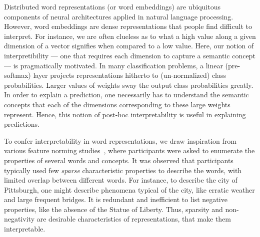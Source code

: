 \documentclass{article}
\begin{document}
Distributed word representations (or word embeddings) are ubiquitous components of neural architectures applied in natural language processing. However, word embeddings are dense representations that people find difficult to interpret. For instance, we are often clueless as to what a high value along a given dimension of a vector signifies when compared to a low value. Here, our notion of interpretibility --- one that requires each dimension to capture a semantic concept --- is pragmatically motivated. In many classification problems, a linear (pre-softmax) layer projects representations hitherto to (un-normalized) class probabilities. Larger values of weights sway the output class probabilities greatly.  
In order to explain a prediction, one necessarily has to understand the semantic concepts that each of the dimensions corresponding to these large weights represent. Hence, this notion of post-hoc interpretability is useful in explaining predictions.



To confer interpretability in word representations, we draw inspiration from various feature norming studies~\cite{garrard2001prototypicality,mcrae2005semantic}, where participants were asked to enumerate the properties of several words and concepts. It was observed that participants typically used few \emph{sparse} characteristic properties to describe the words, with limited overlap between different words. 
For instance, to describe the city of Pittsburgh, one might describe phenomena typical of the city, like erratic weather and large frequent bridges. It is redundant and inefficient to list negative properties, like the absence of the Statue of Liberty. Thus, sparsity and non-negativity are desirable characteristics of representations, that make them interpretable. 
\end{document}
